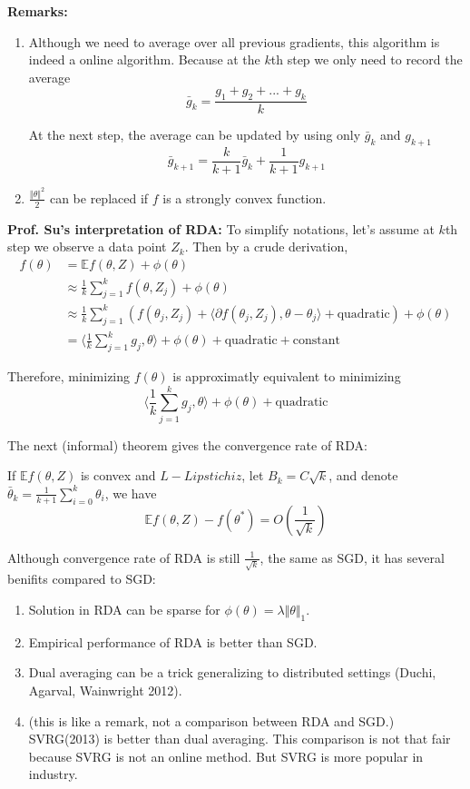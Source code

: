 \textbf{Remarks:}
\begin{enumerate}
	\item Although we need to average over all previous gradients, this algorithm is indeed a online algorithm. Because at the $k$th step we only need to record the average
	\[ \bar{g}_k = \frac{g_1 + g_2 + ... + g_k}{k}  \]
	
	At the next step, the average can be updated by using only $\bar{g}_k$ and $g_{k+1}$
	\[ \bar{g}_{k+1} = \frac{k}{k+1}\bar{g}_k + \frac{1}{k+1}g_{k+1}  \]
	
	\item $\frac{\Vert \theta \Vert^2}{2}$ can be replaced if $f$ is a strongly convex function.
\end{enumerate}

\textbf{Prof. Su's interpretation of RDA:}
To simplify notations, let's assume at $k$th step we observe a data point $Z_k$. Then by a crude derivation,
\begin{align*}
	f(\theta) &= \mathbb{E}f(\theta,Z) + \phi(\theta) \\
	&\approx \frac{1}{k}\sum_{j=1}^k f(\theta,Z_j) + \phi(\theta) \\
	&\approx \frac{1}{k}\sum_{j=1}^k( f(\theta_j,Z_j) + \langle \partial f(\theta_j,Z_j), \theta - \theta_j \rangle + \text{quadratic} ) + \phi(\theta) \\
	&= \langle \frac{1}{k}\sum_{j=1}^k g_j, \theta \rangle + \phi(\theta) + \text{quadratic} + \text{constant}
\end{align*}

Therefore, minimizing $f(\theta)$ is approximatly equivalent to minimizing
\[ \langle \frac{1}{k}\sum_{j=1}^k g_j, \theta \rangle + \phi(\theta) + \text{quadratic}  \]

The next (informal) theorem gives the convergence rate of RDA:
\begin{theorem}
	If $\mathbb{E} f(\theta,Z)$ is convex and $L-Lipstichiz$, let $B_k = C\sqrt{k}$, and denote $\bar\theta_k = \frac{1}{k+1}\sum_{i=0}^k \theta_i$, we have
	\[ \mathbb{E} f(\theta,Z) - f(\theta^\ast) = O(\frac{1}{\sqrt{k}}) \]
\end{theorem}

Although convergence rate of RDA is still $\frac{1}{\sqrt{k}}$, the same as SGD, it has several benifits compared to SGD:
\begin{enumerate}
	\item Solution in RDA can be sparse for $\phi(\theta) = \lambda\Vert\theta\Vert_1$.
	\item Empirical performance of RDA is better than SGD.
	\item Dual averaging can be a trick generalizing to distributed settings (Duchi, Agarval, Wainwright 2012).
	\item (this is like a remark, not a comparison between RDA and SGD.) SVRG(2013) is better than dual averaging. This comparison is not that fair because SVRG is not an online method. But SVRG is more popular in industry.
\end{enumerate}